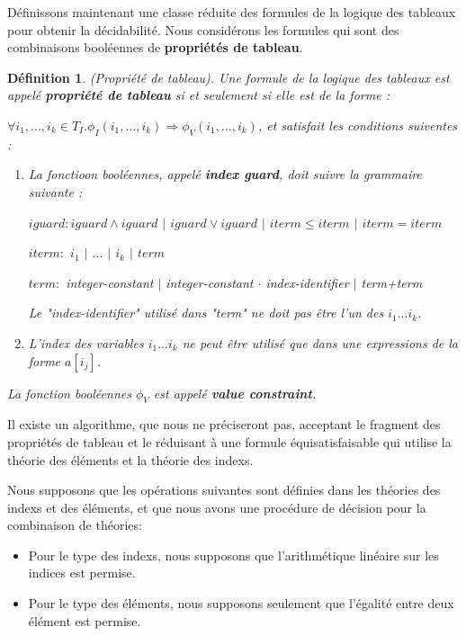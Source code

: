 \documentclass[9pt]{book}
\newtheorem{definition}{D\'efinition}[section]
\begin{document}
	D\'efinissons maintenant une classe r\'eduite des formules de la logique des tableaux pour obtenir la d\'ecidabilit\'e. Nous consid\'erons les formules qui sont des combinaisons bool\'eennes de \textbf{propri\'et\'es de tableau}.
	
	\begin{definition}
		(Propri\'et\'e de tableau). Une formule de la logique des tableaux est appel\'e \textbf{propri\'et\'e de tableau} si et seulement si elle est de la forme :\par
$\forall i_{1},...,i_{k}\in T_{I}.\phi_{I}(i_{1},...,i_{k})\Longrightarrow\phi_{V}(i_{1},...,i_{k})$, et satisfait les conditions suiventes :
\begin{enumerate}
\item La fonctioon bool\'eennes, appel\'e \textbf{index guard}, doit suivre la grammaire suivante :\par
$iguard : iguard\land iguard$ $|$ $iguard\lor iguard$ $|$ $iterm\leq iterm$ $|$ $iterm = iterm$\par
$iterm :$ $i_{1}$ $|$ $...$ $|$ $i_{k}$ $|$ $term$\par
$term :$ integer-constant $|$ integer-constant $\cdot$ index-identifier $|$ term+term\par
Le "index-identifier" utilis\'e dans "term" ne doit pas \^etre l'un des $i_{1}...i_{k}$.
\item L'index des variables $i_{1}...i_{k}$ ne peut \^etre utilis\'e que dans une expressions de la forme $a[i_{j}]$.
\end{enumerate}\par
La fonction bool\'eennes $\phi_{V}$ est appel\'e \textbf{value constraint}.
	\end{definition}
	Il existe un algorithme, que nous ne pr\'eciseront pas, acceptant le fragment des propri\'et\'es de tableau et le r\'eduisant \`a une formule \'equisatisfaisable qui utilise la th\'eorie des \'el\'ements et la th\'eorie des indexs.\par
	Nous supposons que les op\'erations suivantes sont d\'efinies dans les th\'eories des indexs et des \'el\'ements, et que nous avons une proc\'edure de d\'ecision pour la combinaison de th\'eories: 
	\begin{itemize}
	\item Pour le type des indexs, nous supposons que l'arithm\'etique lin\'eaire sur les indices est permise.
	\item Pour le type des \'el\'ements, nous supposons seulement que l'\'egalit\'e entre deux \'el\'ement est permise.
	\end{itemize}
\end{document}
